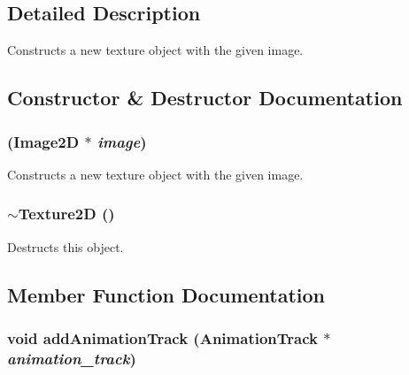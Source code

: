\subsection{Detailed Description}
Constructs a new texture object with the given image. 

\subsection{Constructor \& Destructor Documentation}
\hypertarget{classm3g_1_1Texture2D_7a8d6431e41022e29ac936afc5e97b8e}{
\subsubsection[{Texture2D}]{ ({\bf Image2D} $\ast$ {\em image})}}
\label{classm3g_1_1Texture2D_7a8d6431e41022e29ac936afc5e97b8e}


Constructs a new texture object with the given image. \hypertarget{classm3g_1_1Texture2D_060332aea614a81a914cd2e55f1794df}{
\subsubsection[{$\sim$Texture2D}]{\setlength{\rightskip}{0pt plus 5cm}$\sim${\bf Texture2D} ()}}
\label{classm3g_1_1Texture2D_060332aea614a81a914cd2e55f1794df}


Destructs this object. 

\subsection{Member Function Documentation}
\hypertarget{classm3g_1_1Texture2D_415c0b110f95410ded9b85e5d99a496b}{
\subsubsection[{addAnimationTrack}]{\setlength{\rightskip}{0pt plus 5cm}void addAnimationTrack ({\bf AnimationTrack} $\ast$ {\em animation\_\-track})}}
\label{classm3g_1_1Texture2D_415c0b110f95410ded9b85e5d99a496b}



